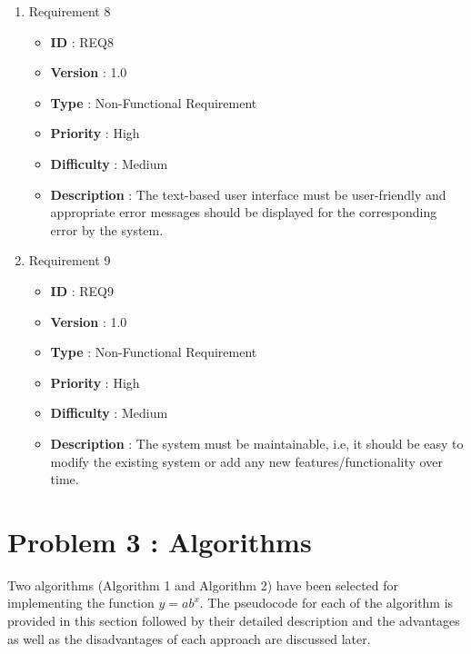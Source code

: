 \documentclass[12pt, a4paper]{article}
\begin{document}
\begin{enumerate}
	\item{} Requirement 8
	\begin{itemize}
		\item \textbf{ID} : REQ8
		\item \textbf{Version} : 1.0
		\item \textbf{Type} : Non-Functional Requirement
		\item \textbf{Priority} : High
		\item \textbf{Difficulty} : Medium
		\item \textbf{Description} : The text-based user interface must be user-friendly and appropriate error messages should be displayed for the corresponding error by the system.
	\end{itemize}
	    
	\item{} Requirement 9
	\begin{itemize}
		\item \textbf{ID} : REQ9
		\item \textbf{Version} : 1.0
		\item \textbf{Type} : Non-Functional Requirement
		\item \textbf{Priority} : High
		\item \textbf{Difficulty} : Medium
		\item \textbf{Description} : The system must be maintainable, i.e, it should be easy to modify the existing system or add any new features/functionality over time.
	\end{itemize}
	    
\end{enumerate}

\newpage

\section{Problem 3 : Algorithms}

Two algorithms (Algorithm 1 and Algorithm 2) have been selected for \newline
implementing the function $y = ab^x $. The pseudocode for each of the algorithm is provided in this section followed by their detailed description and the advantages as well as the disadvantages of each approach are discussed later.
\end{document}
